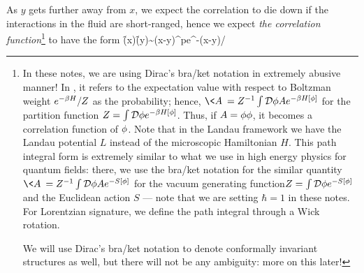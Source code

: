 As $y$ gets further away from $x$, we expect the correlation to die down if the interactions in the fluid are short-ranged, hence we expect \emph{the correlation function}\footnote{In these notes, we are using Dirac's bra/ket notation in extremely abusive manner! In , it refers to the expectation value with respect to Boltzman weight  $e^{-\beta H}/Z$ as the probability; hence, $\<A\>=Z^{-1}\int\cD\f A e^{-\b H[\f]}$ for the partition function $Z=\int\mathcal{D}\phi e^{-\beta H[\phi]}$. Thus, if $A=\phi\phi$, it becomes a correlation function of $\phi$. Note that in the Landau framework we have the Landau potential $L$ instead of the microscopic Hamiltonian $H$. This path integral form is extremely similar to what we use in high energy physics for quantum fields: there, we use the bra/ket notation for the similar quantity $\<A\>=Z^{-1}\int\cD\f A e^{-S[\f]}$ for the vacuum generating function\footnotemark $Z=\int\mathcal{D}\phi e^{-S[\phi]}$ and the Euclidean action $S$ --- note that we are setting $\hbar=1$ in these notes. For Lorentzian signature, we define the path integral through a Wick rotation. 
	
	We will use Dirac's bra/ket notation to denote conformally invariant structures as well, but there will not be any ambiguity: more on this later!
}   to have the form
\be 
\label{eq: correlation length}
\<\f(x)\f(y)\>\sim (x-y)^pe^{-(x-y)/\xi}
\ee 
